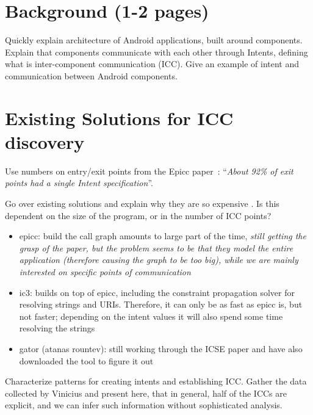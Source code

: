\section{Background (1-2 pages)}

Quickly explain architecture of Android applications, built around components. Explain that components communicate with each other through Intents, defining what is inter-component communication (ICC). Give an example of intent and communication between Android components. 


\section{Existing Solutions for ICC discovery}

Use numbers on entry/exit points from the Epicc paper~\cite{epicc}: ``\emph{About 92\% of exit points had a single Intent specification}''. 

Go over existing solutions and explain why they are so
expensive 
. 
Is this dependent on the size of the program, or in the number of ICC points?
\begin{itemize}
 \item epicc: build the call graph amounts to large part of the time, \emph{still getting the grasp of the paper, but the problem seems to be that they model the entire application (therefore causing the graph to be too big), while we are mainly interested on specific points of communication}
 \item ic3: builds on top of epicc, including the constraint propagation solver for resolving strings and URIs. Therefore, it can only be as fast as epicc is, but not faster; depending on the intent values it will also spend some time resolving the strings
 \item gator (atanas rountev): still working through the ICSE paper and have also downloaded the tool to figure it out
\end{itemize}

Characterize patterns for creating intents and establishing ICC. Gather the data collected by Vinicius and present here, that in general, half of the ICCs are explicit, and we can infer such information without sophisticated analysis. 
